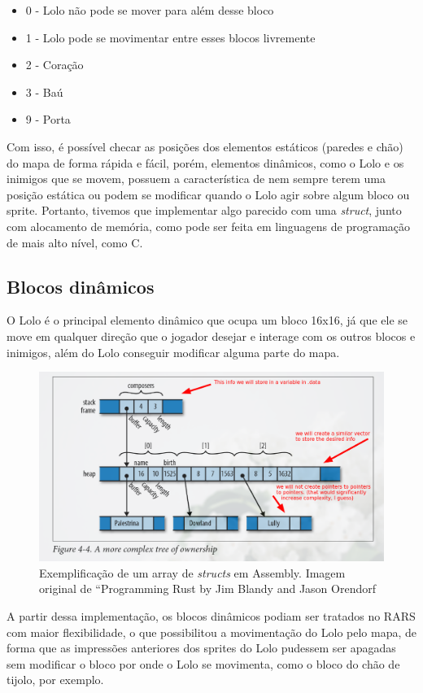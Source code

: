 \documentclass[10pt, conference, compsocconf]{IEEEtran}
\begin{document}
{{\begin{itemize}
    \item 0 - Lolo não pode se mover para além desse bloco
    \item 1 - Lolo pode se movimentar entre esses blocos livremente
    \item 2 - Coração
    \item 3 - Baú
    \item 9 - Porta
\end{itemize}

Com isso, é possível checar as posições dos elementos estáticos (paredes e chão)
do mapa de forma rápida e fácil, porém, elementos dinâmicos, como o Lolo e os
inimigos que se movem, possuem a característica de nem sempre terem uma posição
estática ou podem se modificar quando o Lolo agir sobre algum bloco ou sprite.
Portanto, tivemos que implementar algo parecido com uma \textit{struct}, junto com
alocamento de memória, como pode ser feita em linguagens de programação de mais
alto nível, como C.
}

\subsection{Blocos dinâmicos}{
\label{sec:MIPS}
O Lolo é o principal elemento dinâmico que ocupa um
bloco 16x16, já que ele se move em qualquer direção
que o jogador desejar e interage com os outros blocos
e inimigos, além do Lolo conseguir modificar alguma
parte do mapa.

}

\begin{figure}[htb]
  \begin{center}
   \includegraphics[width=1.0\linewidth]{./Figures/image_8.png}
  \end{center}
  \caption{Exemplificação de um array de \textit{structs}
em Assembly. Imagem original de “Programming
Rust by Jim Blandy and Jason Orendorf}
  \label{fig:01}
\end{figure}

A partir dessa implementação, os blocos dinâmicos podiam ser tratados no RARS
com maior flexibilidade, o que possibilitou a movimentação do Lolo pelo mapa, de
forma que as impressões anteriores dos sprites do Lolo pudessem ser apagadas sem
modificar o bloco por onde o Lolo se movimenta, como o bloco do chão de tijolo,
por exemplo.

}
\end{document}
